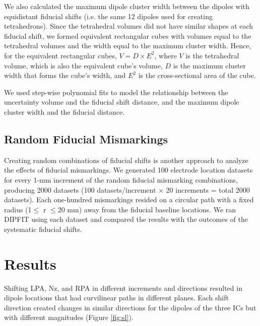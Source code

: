 \documentclass[../thesis_seyed.tex]{subfiles}
\begin{document}
We also calculated the maximum dipole cluster width between the dipoles with equidistant fiducial shifts (i.e. the same 12 dipoles used for creating tetrahedrons). Since the tetrahedral volumes did not have similar shapes at each fiducial shift, we formed equivalent rectangular cubes with volumes equal to the tetrahedral volumes and the width equal to the maximum cluster width. Hence, for the equivalent rectangular cubes, $V = D \times E^2$, where $V$ is the tetrahedral volume, which is also the equivalent cube's volume, $D$ is the maximum cluster width that forms the cube's width, and $E^2$ is the cross-sectional area of the cube.

We used step-wise polynomial fits to model the relationship between the uncertainty volume and the fiducial shift distance, and the maximum dipole cluster width and the fiducial distance.

\subsection{Random Fiducial Mismarkings}
Creating random combinations of fiducial shifts is another approach to analyze the effects of fiducial mismarkings. We generated 100 electrode location datasets for every 1-mm increment of the random fiducial mismarking combinations, producing 2000 datasets (100 datasets/increment $\times$ 20 increments = total 2000 datasets). Each one-hundred mismarkings resided on a circular path with a fixed radius (1$\leq$ r $\leq$20 mm) away from the fiducial baseline locations. We ran DIPFIT using each dataset and compared the results with the outcomes of the systematic fiducial shifts.

\section{Results}

Shifting LPA, Nz, and RPA in different increments and directions resulted in dipole locations that had curvilinear paths in different planes. Each shift direction created changes in similar directions for the dipoles of the three ICs but with different magnitudes (Figure \ref{fig:sl}).
\end{document}
